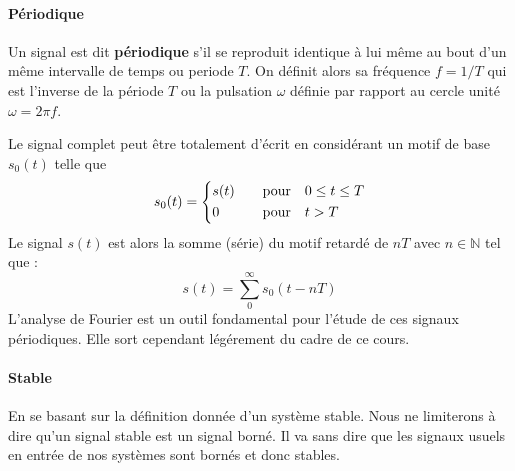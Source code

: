 \paragraph{Périodique}
Un signal est dit \textbf{périodique} s'il se reproduit identique à lui
même au bout d'un même intervalle de temps ou periode $T$. On définit alors 
sa fréquence $f=1/T$ qui est l'inverse de la période $T$ ou la pulsation 
$\omega$ définie par rapport au cercle unité $\omega=2\pi f$.
\begin{figure}[!htb]
    \centering
    
\end{figure}
Le signal complet peut être totalement d'écrit en considérant un motif de base 
$s_0(t)$ telle que
\begin{align*}
    s_0(t) =
    \begin{dcases}
        s(t)&\quad\text{pour}\quad 0\le t\le T   \\
        0&\quad\text{pour}\quad t>T
    \end{dcases}
\end{align*}
Le signal $s(t)$ est alors la somme (série) du motif retardé de $nT$ 
avec $n\in\mathbb{N}$ tel que :
\[
s(t)=\sum_0^\infty s_0(t-nT)
\]
L'analyse de Fourier est un outil fondamental pour l'étude 
de ces signaux périodiques. Elle sort cependant légérement du cadre de 
ce cours.
\newpage
\paragraph{Stable}
En se basant sur la définition donnée d'un système stable.
Nous ne limiterons à dire qu'un signal stable est un signal 
borné. Il va sans dire que les signaux usuels en entrée
de nos systèmes sont bornés et donc stables.

